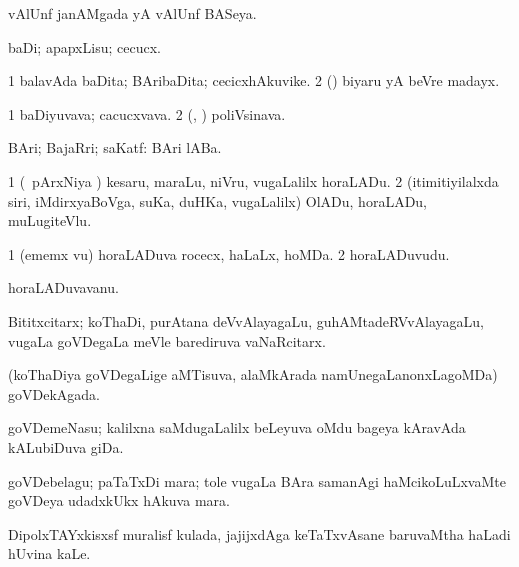 \bentry
{} 
\gl{\gu}
\expl{}
\bmng
vAlUnf janAMgada yA vAlUnf BASeya. 
\emng
\eentry

\bentry
{} 
\gl{\sakirx}
\bmng
baDi; apapxLisu; cecucx. 
\emng
\eentry

\bentry
{} 
\gl{\nA}
\expl{}
\bmng
\bnum
\num{1} balavAda baDita; BAribaDita; cecicxhAkuvike. 
\num{2} (\birx) biyaru yA beVre madayx. 
\enum
\emng
\eentry

\bentry
{} 
\gl{\nA}
\bmng
\bnum
\num{1} baDiyuvava; cacucxvava. 
\num{2} (\AseTxrXV, \ashi) poliVsinava. 
\enum
\emng
\eentry

\bentry
{} 
\gl{\gu}
\expl{}
\bmng
BAri; BajaRri; saKatf:  BAri lABa. 
\emng
\eentry

\bentry
{} 
\gl{\akirx}
\expl{}
\bmng
\bnum
\num{1} (\kanmu\ pArxNiya \vi) kesaru, maraLu, niVru, \mo vugaLalilx horaLADu. 
\num{2} (itimitiyilalxda siri, iMdirxyaBoVga, suKa, duHKa, \mo vugaLalilx) OlADu, horaLADu, muLugiteVlu. 
\enum
\emng
\eentry

\bentry
{} 
\gl{\nA}
\expl{}
\bmng
\bnum
\num{1} (ememx \mo vu) horaLADuva rocecx, haLaLx, hoMDa. 
\num{2} horaLADuvudu. 
\enum
\emng
\eentry

\bentry
{} 
\gl{\nA}
\expl{}
\bmng
horaLADuvavanu. 
\emng
\eentry

\bentry
{} 
\gl{\nA}
\expl{}
\bmng
Bititxcitarx; koThaDi, purAtana deVvAlayagaLu, guhAMtadeRVvAlayagaLu, \mo vugaLa goVDegaLa meVle barediruva vaNaRcitarx. 
\emng
\eentry

\bentry
{} 
\gl{\nA}
\expl{}
\bmng
(koThaDiya goVDegaLige aMTisuva, alaMkArada namUnegaLanonxLagoMDa) goVDekAgada. 
\emng
\eentry

\bentry
{} 
\gl{\nA}
\expl{}
\bmng
goVDemeNasu; kalilxna saMdugaLalilx beLeyuva oMdu bageya kAravAda kALubiDuva giDa. 
\emng
\eentry

\bentry
{} 
\gl{\nA}
\expl{}
\bmng
goVDebelagu; paTaTxDi mara; tole \mo vugaLa BAra samanAgi haMcikoLuLxvaMte goVDeya udadxkUkx hAkuva mara. 
\emng
\eentry

\bentry
{} 
\gl{\nA}
\bmng
DipolxTAYxkisxsf muralisf kulada, jajijxdAga keTaTxvAsane baruvaMtha haLadi hUvina kaLe. 
\emng
\eentry

